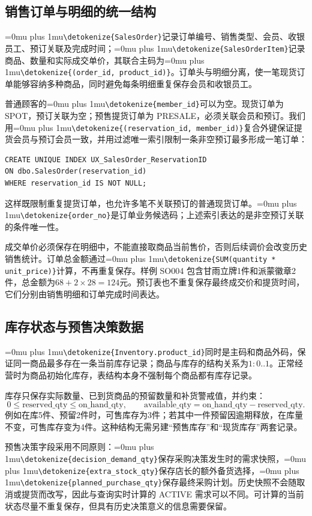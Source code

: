 \documentclass{SYSUReport}
\newcommand{\code}[1]{\begingroup\Urlmuskip=0mu plus 1mu\expandafter\nolinkurl\expandafter{\detokenize{#1}}\endgroup}
\begin{document}
\subsection{销售订单与明细的统一结构}
\code{SalesOrder}记录订单编号、销售类型、会员、收银员工、预订关联及完成时间；\code{SalesOrderItem}记录商品、数量和实际成交单价，其联合主码为\code{(order_id, product_id)}。订单头与明细分离，使一笔现货订单能够容纳多种商品，同时避免每条明细重复保存会员和收银员工。

普通顾客的\code{member_id}可以为空。现货订单为 SPOT，预订关联为空；预售提货订单为 PRESALE，必须关联会员和预订。我们用\code{(reservation_id, member_id)}复合外键保证提货会员与预订会员一致，并用过滤唯一索引限制一条非空预订最多形成一笔订单：
\par{}\noindent\begin{minipage}{\linewidth}
\begin{lstlisting}
CREATE UNIQUE INDEX UX_SalesOrder_ReservationID
ON dbo.SalesOrder(reservation_id)
WHERE reservation_id IS NOT NULL;
\end{lstlisting}
\end{minipage}\par{}
这样既限制重复提货订单，也允许多笔不关联预订的普通现货订单。\code{order_no}是订单业务候选码；上述索引表达的是非空预订关联的条件唯一性。

成交单价必须保存在明细中，不能直接取商品当前售价，否则后续调价会改变历史销售统计。订单总金额通过\code{SUM(quantity * unit_price)}计算，不再重复保存。样例 SO004 包含甘雨立牌1件和派蒙徽章2件，总金额为\(68+2\times28=124\)元。预订表也不重复保存最终成交价和提货时间，它们分别由销售明细和订单完成时间表达。

\subsection{库存状态与预售决策数据}
\code{Inventory.product_id}同时是主码和商品外码，保证同一商品最多存在一条当前库存记录；商品与库存的结构关系为\(1:0..1\)。正常经营时为商品初始化库存，表结构本身不强制每个商品都有库存记录。

库存只保存实际数量、已到货商品的预留数量和补货警戒值，并约束：
\[
0\leq\text{reserved\_qty}\leq\text{on\_hand\_qty},\qquad
\text{available\_qty}=\text{on\_hand\_qty}-\text{reserved\_qty}.
\]
例如在库5件、预留2件时，可售库存为3件；若其中一件预留因逾期释放，在库量不变，可售库存变为4件。这种结构无需另建“预售库存”和“现货库存”两套记录。

预售决策字段采用不同原则：\code{decision_demand_qty}保存采购决策发生时的需求快照，\code{extra_stock_qty}保存店长的额外备货选择，\code{planned_purchase_qty}保存最终采购计划。历史快照不会随取消或提货而改写，因此与查询实时计算的 ACTIVE 需求可以不同。可计算的当前状态尽量不重复保存，但具有历史决策意义的信息需要保留。
\end{document}
